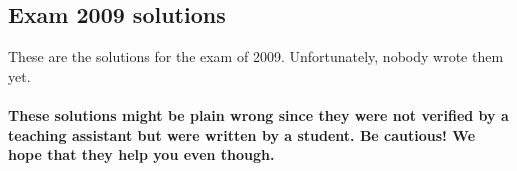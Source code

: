 \documentclass[main]{subfiles}
\begin{document}

\subsection{Exam 2009 solutions}
These are the solutions for the exam of 2009. Unfortunately, nobody wrote them yet.
\\\\
\textbf{These solutions might be plain wrong since they were not verified by a teaching assistant but were written by a student. Be cautious! We hope that they help you even though.}

\end{document}
